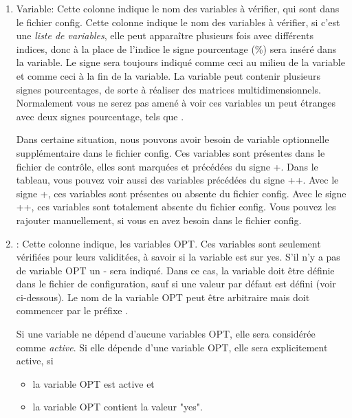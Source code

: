\begin{enumerate}

\item Variable: Cette colonne indique le nom des variables à vérifier, qui sont
  dans le fichier config. Cette colonne indique le nom des variables à vérifier,
  si c'est une \emph{liste de variables}, elle peut apparaître plusieurs fois avec
  différents indices, donc à la place de l'indice le signe pourcentage (\%) sera inséré
  dans la variable. Le signe sera toujours indiqué comme ceci \og{}\var{\_\%\_}\fg{} au
  milieu de la variable et comme ceci \og{}\var{\_\%}\fg{} à la fin de la variable. La
  variable peut contenir plusieurs signes pourcentages, de sorte à réaliser des matrices
  multidimensionnels. Normalement vous ne serez pas amené à voir ces variables un peut
  étranges avec deux signes pourcentage, tels que \og{}\fg{}.

  Dans certaine situation, nous pouvons avoir besoin de variable optionnelle
  supplémentaire dans le fichier config. Ces variables sont présentes dans le
  fichier de contrôle, elles sont marquées et précédées du signe \og{}+\fg{}. Dans le
  tableau, vous pouvez voir aussi des variables précédées du signe \og{}++\fg{}. Avec
  le signe \og{}+\fg{}, ces variables sont présentes ou absente du fichier config. Avec
  le signe \og{}++\fg{}, ces variables sont totalement absente du fichier config. Vous
  pouvez les rajouter manuellement, si vous en avez besoin dans le fichier config.

\item {}: Cette colonne indique, les variables OPT. Ces variables
  sont seulement vérifiées pour leurs validitées, à savoir si la variable est sur \og{}yes\fg{}.
  S'il n'y a pas de variable OPT un \og{}-\fg{} sera indiqué. Dans ce cas, la variable
  doit être définie dans le fichier de configuration, sauf si une valeur par défaut est
  défini (voir ci-dessous). Le nom de la variable OPT peut être arbitraire mais doit commencer
  par le préfixe \og{}\fg{}.

  Si une variable ne dépend d'aucune variables OPT, elle sera considérée comme
  \emph{active}. Si elle dépende d'une variable OPT, elle sera explicitement active, si

  \begin{itemize}
  \item la variable OPT est active et
  \item la variable OPT contient la valeur "yes".
  \end{itemize}


\end{enumerate}
